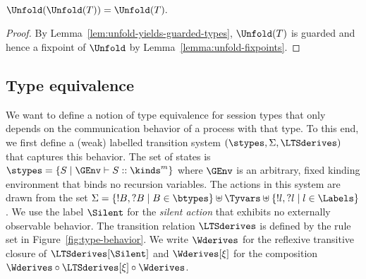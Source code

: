 \begin{lemma}
  \label{lemma:app:unfold-idempotent}
  $\Unfold (\Unfold (T)) = \Unfold (T).$
\end{lemma}
\begin{proof}
  By Lemma~\ref{lem:unfold-yields-guarded-types}, $\Unfold (T)$ is guarded and hence a fixpoint of
  $\Unfold$ by Lemma~\ref{lemma:unfold-fixpoints}.
\end{proof}

\subsection{Type equivalence}
\label{sec:type-equivalence}

We want to define a notion of type equivalence for session types that
only depends on the communication behavior of a process with that
type. To this end, we first define a (weak) labelled transition system
$(\stypes, \Sigma, \LTSderives)$ that captures this behavior. The set
of states is  $\stypes = \{ S \mid \GEnv \vdash S :: \kinds^m \}$
where $\GEnv$ is an arbitrary, fixed kinding environment that binds no
recursion variables. The
actions in this system are drawn from the set $\Sigma = \{ {!B}, {?B}
\mid  B \in \btypes \} \uplus \Tyvars \uplus \{ {!l}, {?l} \mid l
\in \Labels\} $. We use the label $\Silent$ for the \emph{silent
  action} that exhibits no externally observable behavior. The transition
relation $\LTSderives$ is defined by the rule set in Figure~\ref{fig:type-behavior}. We write
$\Wderives$ for the reflexive transitive closure of $\LTSderives[\Silent]$ and $\Wderives[\xi]$ for
the composition $\Wderives \circ \LTSderives[\xi] \circ \Wderives$.


